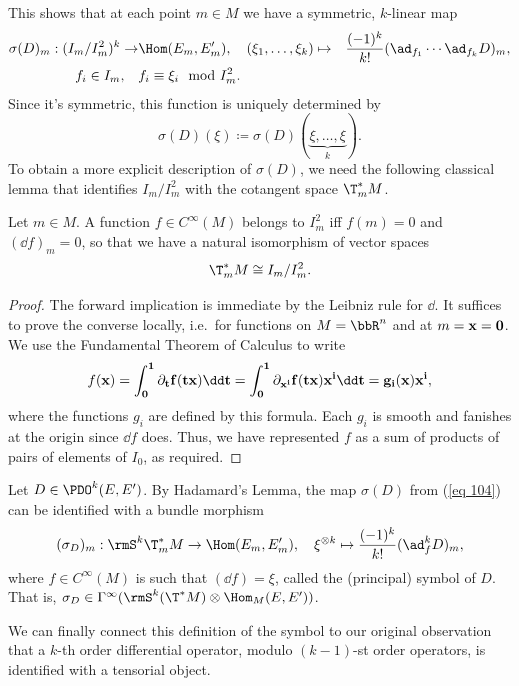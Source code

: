 This shows that at each point $m\in M$ we have a symmetric, $k$-linear map 
\begin{align}
    \sigma(D)_m:(I_m\slash I_m^2)^k\to& \Hom(E_m,E_m'),\quad 
    (\xi_1,\ldots,\xi_k)\mapsto& \frac{(-1)^k}{k!}(\ad_{f_1}\cdots \ad_{f_k}D)_m,\label{eq 104}\\
    f_i\in I_m,\quad &f_i\equiv \xi_i\mod I^2_m.
\end{align}
Since it's symmetric, this function is uniquely determined by 
\[\sigma(D)(\xi)\coloneqq \sigma(D)(\underbrace{\xi,\ldots,\xi}_k).\]
To obtain a more explicit description of $\sigma(D)$, we need the following classical lemma that identifies $I_m\slash I^2_m$ with the cotangent space $\T^\ast_m M$.

\begin{lem}
    Let $m\in M$. A function $f\in C^\infty(M)$ belongs to $I^2_m$ iff $f(m)=0$ and $(\dd f)_m=0$, so that we have a natural isomorphism of vector spaces 
    \[\T^\ast_m M\cong I_m\slash I^2_m.\]
\end{lem}
\begin{proof}
    The forward implication is immediate by the Leibniz rule for $\dd$. It suffices to prove the converse locally, i.e.\ for functions on $M=\bbR^n$ and at $m=\bf{x}=0$. We use the Fundamental Theorem of Calculus to write 
    \[f(\bf{x})=\int_0^1 \partial_t f(t\bf{x})\dd t=\int_0^1 \partial_{x^i}f(t\bf{x})x^i\dd t=g_i(\bf{x})x^i,\]
    where the functions $g_i$ are defined by this formula. Each $g_i$ is smooth and fanishes at the origin since $\dd f$ does. Thus, we have represented $f$ as a sum of products of pairs of elements of $I_0$, as required. 
\end{proof}

\begin{defn}[Symbol]
    Let $D\in\PDO^k(E,E')$. By Hadamard's Lemma, the map $\sigma(D)$ from (\ref{eq 104}) can be identified with a bundle morphism
    \[(\sigma_D)_m:\rmS^k \T^\ast_mM\to \Hom(E_m,E_m'),\quad \xi^{\otimes k}\mapsto \frac{(-1)^k}{k!}(\ad_f^k D)_m, \]
    where $f\in C^\infty(M)$ is such that $(\dd f)=\xi$, called the (principal) symbol of $D$. That is, $\sigma_D\in \Gamma^\infty(\rmS^k(\T^\ast M)\otimes \Hom_M(E,E'))$.
\end{defn}

We can finally connect this definition of the symbol to our original observation that a $k$-th order differential operator, modulo $(k-1)$-st order operators, is identified with a tensorial object.

